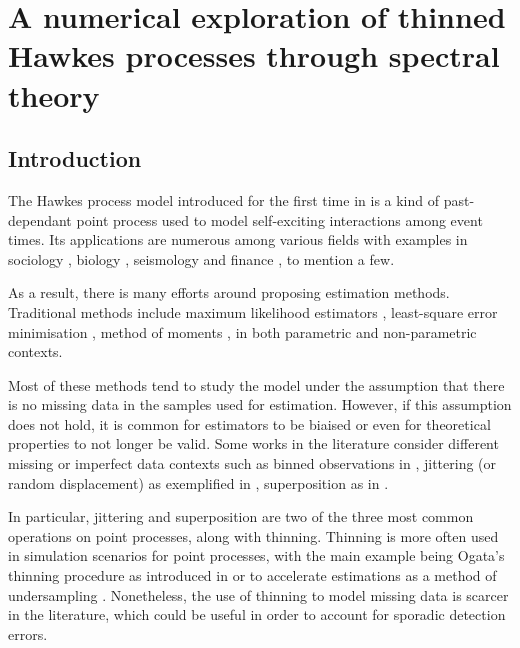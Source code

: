 
\chapter[][]{A numerical exploration of thinned Hawkes processes through spectral theory}\label{chapter:spectral_thinning}

\section{Introduction}

The Hawkes process model introduced for the first time in \textcite{Hawkes1971} is a kind of past-dependant point process used to model self-exciting interactions among event times. 
Its applications are numerous among various fields with examples in sociology \parencite{Linderman2014},
biology \parencite{Gupta2018, Lambert2018, Rizoiu2018},
seismology \parencite{Ogata1988, Ogata1998}
and finance \parencite{Bacry2013, Bacry2015, Hawkes2018}, to mention a few.

As a result, there is many efforts around proposing estimation methods. Traditional methods include maximum likelihood estimators \parencite{Ogata1978, Ozaki1979}, least-square error minimisation \parencite{Reynaud2014,Bacry2020}, method of moments \parencite{DaFonseca2013}, in both parametric and non-parametric contexts.

Most of these methods tend to study the model under the assumption that there is no missing data in the samples used for estimation. 
However, if this assumption does not hold, it is common for estimators to be biaised or even for theoretical properties to not longer be valid.
Some works in the literature consider different missing or imperfect data contexts such as binned observations in \textcite{Cheysson2022}, jittering (or random displacement) as exemplified in \textcite{Antoniadis2006,Bonnet2022}, superposition as in \textcite{Bonnet2024}. 

In particular, jittering and superposition are two of the three most common operations on point processes, along with thinning.
Thinning is more often used in simulation scenarios for point processes, 
with the main example being Ogata's thinning procedure as introduced in \parencite{Ogata1981} or to accelerate estimations as a method of undersampling \parencite{Li2019}.
Nonetheless, the use of thinning to model missing data is scarcer in the literature, 
which could be useful in order to account for sporadic detection errors.

